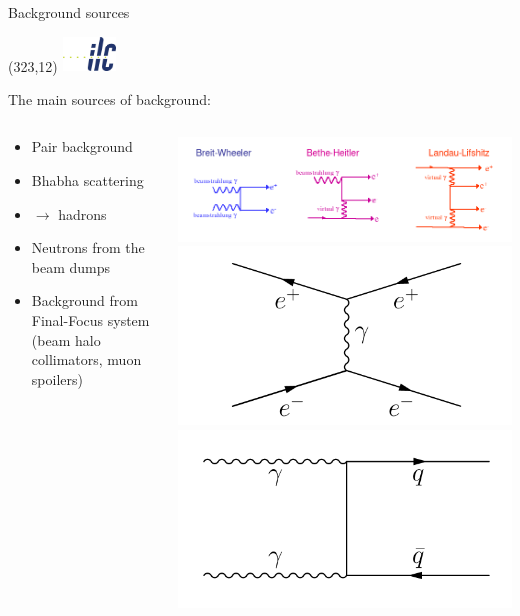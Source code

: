 \documentclass[xcolor={dvipsnames}]{beamer}
\newcommand{\ilclogo}{
  \setlength{\TPHorizModule}{1pt}
  \setlength{\TPVertModule}{1pt}
  \begin{textblock}{1}(323,12)
   \includegraphics[width=40pt,height=26pt]{figures/ILC.jpeg}
  \end{textblock}
}
\begin{document}
\begin{frame}{Background sources}
\ilclogo
The main sources of background:
\begin{columns}
 \begin{column}{0.55\textwidth}
  \begin{itemize}
    \item Pair background
    \item Bhabha scattering
    \item \textgamma \textgamma $\rightarrow$ hadrons
    \item Neutrons from the beam dumps
    \item Background from Final-Focus system (beam halo collimators, muon spoilers)
  \end{itemize}
 \end{column}
 \begin{column}{0.45\textwidth}
 \includegraphics[height=0.2\textheight]{figures/beamstrahlung_processes.png}\\
 \includegraphics[height=0.15\textheight]{figures/bhabha_scattering.pdf} 
 \includegraphics[height=0.15\textheight]{figures/gammagamma_hadrons.pdf}
 \end{column}
\end{columns}


\end{frame}
\end{document}

